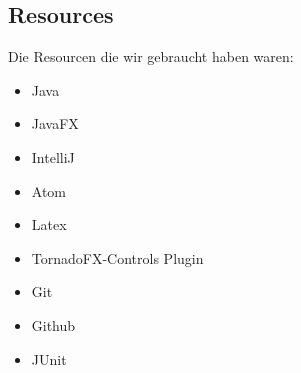 \subsection{Resources}
Die Resourcen die wir gebraucht haben waren:
\begin{itemize}
  \item Java
  \item JavaFX
  \item IntelliJ
  \item Atom
  \item Latex
  \item TornadoFX-Controls Plugin
  \item Git
  \item Github
  \item JUnit

\end{itemize}
